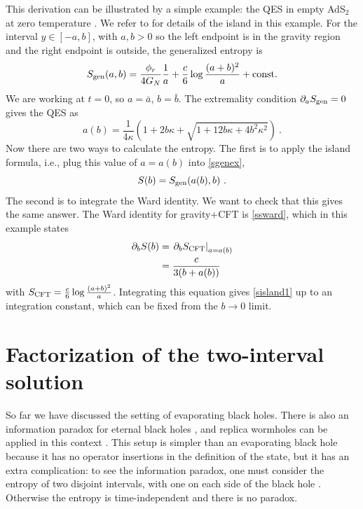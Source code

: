 \documentclass[11pt,oneside,letterpaper]{article}
\newcommand{\p}{\partial}
\newcommand{\f}{\frac}
\newcommand{\be}{\begin{equation}}
\newcommand{\ee}{\end{equation}}
\def\be{\begin{eqnarray}}
\def\ee{\end{eqnarray}}
\let\f=\frac
\def\be{\begin{equation}}
\def\ee{\end{equation}}
\renewcommand{\p}{\partial}
\numberwithin{equation}{section}
\def\p{{\phi}}
\def\be{\begin{equation}}
\def\ee{\end{equation}}
\def\f {\frac}
\def \be {\begin{equation}}
\def \ee {\end{equation}}
\renewcommand{\p}{\partial}
\begin{document}
\begin{spacing}{1.1}
This derivation can be illustrated by a simple example: the QES in empty AdS$_2$ at zero temperature \cite{Almheiri:2019yqk,Almheiri:2019qdq}. We refer to \cite[Section 4.1]{Almheiri:2019qdq} for details of the island in this example. For the interval $ y \in [-a,b]$, with $a,b>0$ so the left endpoint is in the gravity region and the right endpoint is outside, the generalized entropy is 
\be\label{sgenex}
S_{\rm gen}(a,b) =\f{\phi_r}{4G_N} \frac{1}{a} + \frac{c}{6} \log \frac{ (a+b)^2}{a}  + \mbox{const.} 
\ee
We are working at $t=0$, so $a=\bar{a}$, $b = \bar{b}$. The extremality condition $\p_a S_{\rm gen} = 0$ gives the QES as
\be
a(b) =   \frac{1}{4\kappa}(1 +2 b\kappa + \sqrt{1+  12b\kappa +4 b^2 \kappa^2} ) \ .
\ee
Now there are two ways to calculate the entropy. The first is to apply the island formula, i.e., plug this value of $a = a(b)$ into \eqref{sgenex}, 
\be\label{sisland1}
S(b) = S_{\rm gen}(a(b), b) \ .
\ee
The second is to integrate the Ward identity. We want to check that this gives the same answer. The Ward identity for gravity+CFT is \eqref{ssward}, which in this example states
\begin{align}
\p_b S(b) &=\left. \p_b S_{\rm CFT}\right|_{a=a(b)}\\
&= \frac{c}{3(b + a(b))} \notag
\end{align}
with $S_{\rm CFT} = \frac{c}{6}  \log \frac{ (a+b)^2}{a}$. 
Integrating this equation gives \eqref{sisland1} up to an integration constant, which can be fixed from the $b\to 0$ limit. 




 


 
 \section{Factorization of the two-interval solution} \label{sec:fac}
 

So far we have discussed the setting of evaporating black holes. There is also an information paradox for eternal black holes \cite{Almheiri:2019yqk}, and replica wormholes can be applied in this context \cite{Almheiri:2019qdq}. This setup is simpler than an evaporating black hole because it has no operator insertions in the definition of the state, but it has an extra complication: to see the information paradox, one must consider the entropy of two disjoint intervals, with one on each side of the black hole \cite{Almheiri:2019yqk}. Otherwise the entropy is time-independent and there is no paradox.


\end{spacing}
\end{document}

